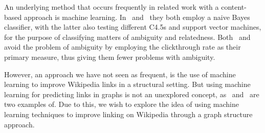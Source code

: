 An underlying method that occurs frequently in related work with a content-based approach is machine learning. In~\cite{mihalcea2007wikify} and~\cite{milne2008learning} they both employ a naive Bayes classifier, with the latter also testing different C4.5s and support vector machines, for the purpose of classifying matters of ambiguity and relatedness. Both~\cite{hyperlink-structure-using-logs} and~\cite{west2015mining} avoid the problem of ambiguity by employing the clickthrough rate as their primary measure, thus giving them fewer problems with ambiguity. 

However, an approach we have not seen as frequent, is the use of machine learning to improve Wikipedia links in a structural setting. But using machine learning for predicting links in graphs is not an unexplored concept, as~\cite{tang2015line} and~\cite{al2006link} are two examples of. Due to this, we wish to explore the idea of using machine learning techniques to improve linking on Wikipedia through a graph structure approach.



